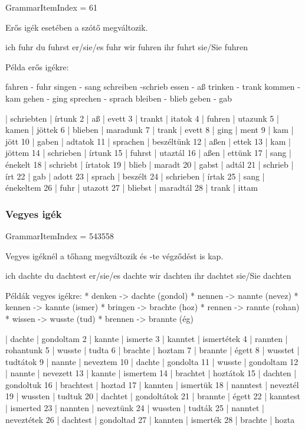 \documentclass{article}
\newenvironment{desc}{\verbatim}{\endverbatim}
\newenvironment{exmp}{\verbatim}{\endverbatim}
\begin{document}
GrammarItemIndex = 61

\begin{desc}
Erős igék esetében a szótő megváltozik.

ich fuhr
du fuhrst
er/sie/es fuhr
wir fuhren
ihr fuhrt
sie/Sie fuhren

Példa erős igékre:

fahren - fuhr
singen - sang
schreiben -schrieb
essen - aß
trinken - trank
kommen - kam
gehen - ging
sprechen - sprach
bleiben - blieb
geben - gab

\end{desc}

\begin{exmp}
1 | schriebten | írtunk
2 | aß | evett
3 | trankt | itatok
4 | fuhren | utazunk
5 | kamen | jöttek
6 | blieben | maradunk
7 | trank | evett
8 | ging | ment
9 | kam | jött
10 | gaben | adtatok
11 | sprachen | beszéltünk
12 | aßen | ettek
13 | kam | jöttem
14 | schrieben | írtunk
15 | fuhrst | utaztál
16 | aßen | ettünk
17 | sang | énekelt
18 | schriebt | írtatok
19 | blieb | maradt
20 | gabst | adtál
21 | schrieb | írt
22 | gab | adott
23 | sprach | beszélt
24 | schrieben | írtak
25 | sang | énekeltem
26 | fuhr | utazott
27 | bliebst | maradtál
28 | trank | ittam
\end{exmp}

\subsubsection{Vegyes igék}

GrammarItemIndex = 543558

\begin{desc}
Vegyes igéknél a tőhang megváltozik és -te végződést is kap.

ich dachte
du dachtest
er/sie/es dachte
wir dachten
ihr dachtet
sie/Sie dachten

Példák vegyes igékre:
* denken -> dachte (gondol)
* nennen -> nannte (nevez)
* kennen -> kannte (ismer)
* bringen -> brachte (hoz)
* rennen -> rannte (rohan)
* wissen -> wusste (tud)
* brennen -> brannte (ég)
\end{desc}

\begin{exmp}
1 | dachte | gondoltam
2 | kannte | ismerte
3 | kanntet | ismertétek
4 | rannten | rohantunk
5 | wusste | tudta
6 | brachte | hoztam
7 | brannte | égett
8 | wusstet | tudtátok
9 | nannte | neveztem
10 | dachte | gondolta
11 | wusste | gondoltam
12 | nannte | nevezett
13 | kannte | ismertem
14 | brachtet | hoztátok
15 | dachten | gondoltuk
16 | brachtest | hoztad
17 | kannten | ismertük
18 | nanntest | neveztél
19 | wussten | tudtuk
20 | dachtet | gondoltátok
21 | brannte | égett
22 | kanntest | ismerted
23 | nannten | neveztünk
24 | wussten | tudták
25 | nanntet | neveztétek
26 | dachtest | gondoltad
27 | kannten | ismerték
28 | brachte | hozta
\end{exmp}
\end{document}

